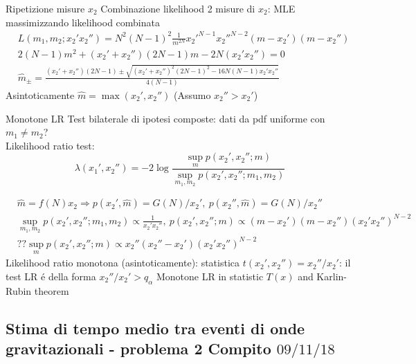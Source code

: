 \documentclass[asd-beamer.tex]{subfiles}
\begin{document}
\begin{frame}{Ripetizione misure $x_2$}
Combinazione likelihood 2 misure di $x_2$: MLE massimizzando likelihood combinata
\begin{align*}
&L(m_1,m_2;x_2'x_2'')=N^2(N-1)^2\frac{1}{m^{2N}}{x_2'}^{N-1}{x_2''}^{N-2}(m-x_2')(m-x_2'')\\
&2(N-1)m^2+(x_2'+x_2'')(2N-1)m-2N(x_2'x_2'')=0\\
&\hat{m}_{\pm}=\frac{(x_2'+x_2'')(2N-1)\pm\sqrt{(x_2'+x_2'')^2(2N-1)^2-16N(N-1)x_2'x_2''}}{4(N-1)}
\end{align*}
Asintoticamente $\hat{m}=\max{(x_2',x_2'')}$ (Assumo $x_2''>x_2'$)
\end{frame}

\begin{frame}{Monotone LR}
Test bilaterale di ipotesi composte: dati da pdf uniforme con $m_1\neq m_2$? \\
Likelihood ratio test:
\begin{equation*}
\lambda(x_1',x_2'')=-2\log{\frac{\sup_m{p(x_2',x_2'';m)}}{\sup_{m_1,m_2}{p(x_2',x_2'';m_1,m_2)}}}
\end{equation*}

\begin{align*}
&\hat{m}=f(N)x_2\Rightarrow p(x_2',\hat{m})=G(N)/x_2',\ p(x_2'',\hat{m})=G(N)/x_2''\\
&\sup_{m_1,m_2}{p(x_2',x_2'';m_1,m_2)}\propto\frac{1}{x_2'x_2''},\ p(x_2',x_2'';m)\propto(m-x_2')(m-x_2'')(x_2'x_2'')^{N-2}\\
&??\sup_{m}p(x_2',x_2'';m)\propto x_2''(x_2''-x_2')(x_2'x_2'')^{N-2}
\end{align*}
Likelihood ratio monotona (asintoticamente): statistica $t(x_2',x_2'')=x_2''/x_2'$: il test LR \'e della forma $x_2''/x_2'>q_{\alpha}$
Monotone LR in statistic $T(x)$ and Karlin-Rubin theorem
\end{frame}

\subsection{Stima di tempo medio tra eventi di onde gravitazionali - problema 2 Compito $09/11/18$}
\end{document}
